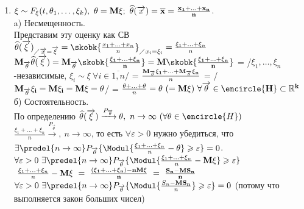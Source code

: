 \begin{proofs}
  \begin{dokvo}
      \begin{enumerate}
        \item $\xi \sim F_{\xi}(t,\theta_1,\ldots,\xi_k), \ \theta = \bf{M}\xi; \
        \widehat{\theta}(\overrightarrow{x}) = \overline{x} = \frac{x_1 + \ldots + x_n}{n}$. \\
        a) Несмещенность.\\
        Представим эту оценку как СВ $\widehat{\theta}(\overrightarrow{\xi})_{\diagup \overrightarrow{x} = \overrightarrow{\xi}} =
        \skobk{\frac{x_1+\ldots+x_n}{n}}_{\diagup x_i=\xi_i} = \frac{\xi_1+\ldots+\xi_n}{n}$\\
        $\bf{M}_{\overrightarrow{\theta}}\widehat{\theta}(\overrightarrow{\xi}) =
        \bf{M}_{\overrightarrow{\theta}}\skobk{\frac{\xi_1+\ldots+\xi_n}{n}} = \bf{M}\skobk{\frac{\xi_1+\ldots+\xi_n}{n}}$ =
        /$\xi_1,\ldots,\xi_n$-независимые, $\xi_i \sim \xi \ \forall i \in \overline{1,n}$/ =
        $\frac{\bf{M}_{\overrightarrow{\theta}}\xi_1 + \ldots + \bf{M}_{\overrightarrow{\theta}}\xi_n}{n}$ = /$\bf{M}_{\overrightarrow{\theta}}\xi_i =
        \bf{M}\xi_i = \bf{M}\xi = \theta$/ = $\frac{\theta + \ldots + \theta}{n}
        = \theta \ (=\bf{M}\xi) \ \forall \overrightarrow{\theta} \in \encircle{H} \subset \mathbb{R}^k$\\
        б) Состоятельность.\\
        По определению $\widehat{\theta}(\overrightarrow{\xi})\xrightarrow[]{P_{\overrightarrow{\theta}}}\theta, \ n \to \infty \ (\forall \theta \in \encircle{H})$
        $\frac{\xi_1+\ldots+\xi_n}{n}\xrightarrow[]{{P_{\overrightarrow{\theta}}}}, \ n \to \infty$, то есть $\forall \varepsilon > 0$ нужно убедиться, что
        $\exists\predel{n \to \infty}P_{\overrightarrow{\theta}}\{\Modul{\frac{\xi_1+\ldots+\xi_n}{n} - \theta} \geqslant \varepsilon\} = 0$.
        $\forall \varepsilon > 0 \ \exists\predel{n \to \infty}P_{\overrightarrow{\theta}}\{\Modul{\frac{\xi_1+\ldots+\xi_n}{n}-\bf{M}\xi} \geqslant \varepsilon\}$
        $\ \frac{\xi_1+\ldots+\xi_n}{n}-\bf{M}\xi \ = \ \frac{(\xi_1+\ldots+\xi_n) - n\bf{M}\xi}{n} \ = \ \frac{S_n-\bf{M}S_n}{n}$\\
        $\forall \varepsilon > 0 \ \exists\predel{n \to \infty}P_{\overrightarrow{\theta}}\{\Modul{\frac{S_n-\bf{M}S_n}{n}} \geqslant \varepsilon\} = 0$
        (потому что выполняется закон больших чисел)


\end{enumerate}
\end{dokvo}
\end{proofs}
